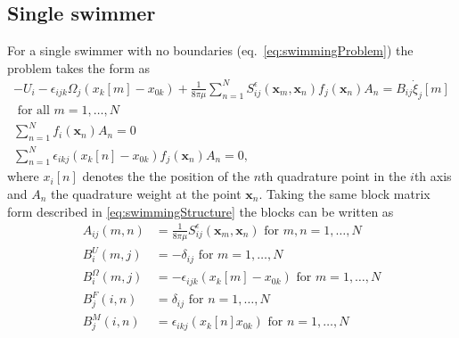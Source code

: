\subsection{Single swimmer}
For a single swimmer with no boundaries (eq.~\ref{eq:swimmingProblem}) the problem takes the form as 
\begin{equation*}
\begin{gathered}
    -U_{i}-\epsilon_{i j k} \Omega_{j}\left(x_k[{m}]-x_{0 k}\right)+\frac{1}{8 \pi\mu} \sum_{n=1}^N S_{i j}^{\epsilon}(\bm{x}_m, \bm{x}_n) f_{j}(\bm{x}_n) A_n =  B_{i j} \dot{\xi}_{j}[m] \\ \text { for all } m = 1,\dots,N\\
    \sum_{n=1}^N f_{i}(\bm{x}_n) A_n=0 \\
    \sum_{n=1}^N \epsilon_{i k j} (x_{k}[n]-x_{0 k}) f_{j}(\bm{x}_n) A_n=0,
\end{gathered}
\end{equation*}
where $x_{i}[n]$ denotes the the position of the $n$th quadrature point in the $i$th axis and $A_n$ the quadrature weight at the point $\bm{x}_n$. Taking the same block matrix form described in \cref{eq:swimmingStructure} the blocks can be written as
\begin{equation*}
\begin{aligned}
A_{ij}(m,n) &= \frac{1}{8\pi\mu} S_{ij}^\epsilon (\bm{x}_m,\bm{x}_{n}) \text { for } m,n = 1,\dots,N \\
B_{i}^{U}(m,j) &= -\delta_{ij} \text { for } m = 1,\dots,N \\
B_{i}^{\Omega}(m,j) &= -\epsilon_{ijk}(x_k[m]-x_{0k}) \text { for } m = 1,\dots,N \\
B_{j}^{F}(i,n) &= \delta_{ij} \text { for } n = 1,\dots,N \\
B_{j}^{M}(i,n) &= \epsilon_{ikj} (x_k[n]x_{0 k}) \text { for } n = 1,\dots,N
\end{aligned}
\end{equation*}

